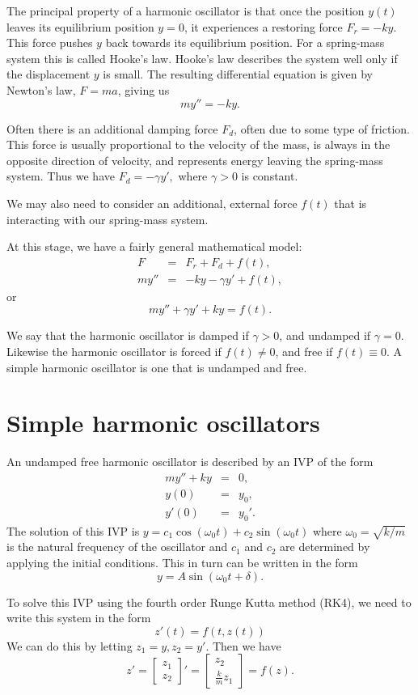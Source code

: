 The principal property of a harmonic oscillator is that once the position $y(t)$ leaves its equilibrium position $y = 0$, it experiences a restoring force $F_r = -ky.$ This force pushes $y$ back towards its equilibrium position. For a spring-mass system this is called Hooke's law. Hooke's law describes the system well only if the displacement $y$ is small. The resulting differential equation is given by Newton's law, $F = ma$, giving us 
\[my'' = -ky.\]

Often there is an additional damping force $F_d$, often due to some type of friction. This force is usually proportional to the velocity of the mass, is always in the opposite direction of velocity, and represents energy leaving the spring-mass system. Thus we have $F_d = -\gamma y', $ where $ \gamma > 0$ is constant. 

We may also need to consider an additional, external force $f(t)$ that is interacting with our spring-mass system.

At this stage, we have a fairly general mathematical model: 
\begin{eqnarray*}
F &=& F_r + F_d + f(t),\\
my'' &=& -ky -\gamma y' + f(t),
\end{eqnarray*}
or 
\[my''+\gamma y' + ky = f(t). \]

We say that the harmonic oscillator is damped if $\gamma > 0$, and undamped if $\gamma =0$. Likewise the harmonic oscillator is forced if $f(t) \not = 0$, and free if $f(t) \equiv 0$. A simple harmonic oscillator is one that is undamped and free. 

\section*{Simple harmonic oscillators}
An undamped free harmonic oscillator is described by an IVP of the form
\begin{eqnarray*}
my'' + ky &=& 0,\\
y(0) &=& y_0,\\
y'(0) &=& y_0'.
\end{eqnarray*} 
The solution of this IVP is $y = c_1\cos (\omega_0 t) + c_2 \sin (\omega_0 t)$ where $\omega_0 = \sqrt{k/m}$ is the natural frequency of the oscillator and $c_1$ and $c_2$ are determined by applying the initial conditions. This in turn can be written in the form 
\[y = A\sin (\omega_0 t + \delta) .\]

To solve this IVP using the fourth order Runge Kutta method (RK4), we need to write this system in the form 
\[z'(t) = f(t,z(t)) \]
We can do this by letting $z_1 = y, z_2 = y'$. Then we have 
\[     z'=  \left[\begin{array}{c}z_1 \\z_2\end{array}\right]'  =  \left[\begin{array}{c}z_2 \\\frac{k}{m}z_1\end{array}\right]= f(z).\]

